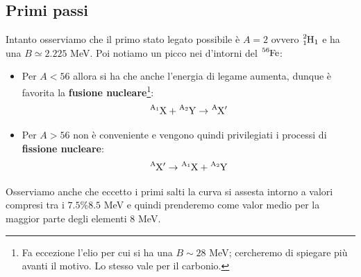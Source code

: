 \subsection{Primi passi} 
Intanto osserviamo che il primo stato legato possibile è $A=2$ ovvero $\ce{^2_1H_1}$ e ha una $B\simeq 2.225$ MeV. Poi notiamo un picco nei d'intorni del $\ce{^56Fe}$:
\begin{itemize}
    \item Per $A<56$ allora si ha che  anche l'energia di legame aumenta, dunque è favorita la \textbf{fusione nucleare}\footnote{Fa eccezione l'elio per cui si ha una $B\sim 28$ MeV; cercheremo di spiegare più avanti il motivo. Lo stesso vale per il carbonio.}:
    $$\ce{^{A_1}X} + \ce{^{A_2}Y} \to \ce{^AX}'$$
    \item Per $A>56$  non è conveniente e vengono quindi privilegiati i processi di \textbf{fissione nucleare}:
    $$\ce{^AX}' \to \ce{^{A_1}X} + \ce{^{A_2}Y}$$
\end{itemize}
\noindent Osserviamo anche che eccetto i primi salti la curva si assesta intorno a valori compresi tra i $7.5 \% 8.5$ MeV e quindi prenderemo come valor medio per la maggior parte degli elementi 8 MeV.

